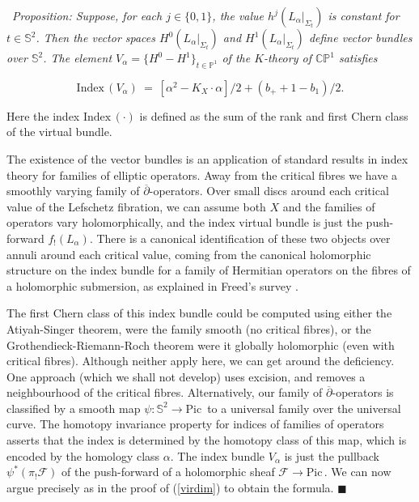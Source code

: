 \documentclass[10pt]{article}
\newcommand{\pp}{\mathbb{P}}
\newcommand{\cc}{\mathbb{C}}
\newcommand{\sss}{\mathbb{S}}
\newcommand{\cdbar}{\overline{\partial}}
\newcommand{\Pic}{\mathrm{Pic \,}}
\newcommand{\ind}{\mathrm{Index \,}}
\newcounter{Universal}[section]
\renewcommand{\theUniversal}{\thesection.\arabic{Universal}}
\newenvironment{Italic}{\refstepcounter{Universal} \par \vspace{0.5cm}
\noindent {\bf (\theUniversal)}\ \it}{\par \vspace{0.5cm}}
\newenvironment{Prop}{\begin{Italic}{\sc Proposition:} }{\end{Italic}}
\newenvironment{Pf}{\par \noindent{\sc Proof:} }{\quad $\blacksquare$ \par
\vspace{0.5cm}}
\begin{document}
\begin{Prop} \label{indextheorem} Suppose, for each $j \in \{ 0,1 \}$,
  the value  $h^j
  (L_{\alpha}|_{\Sigma_t})$ is constant for $t \in \sss^2$.  Then the
  vector spaces $H^0 (L_{\alpha}|_{\Sigma_t})$ and $H^1
(L_{\alpha}|_{\Sigma_t})$ define vector bundles over $\sss^2$. The 
element $V_{\alpha} = \{ H^0 - H^1 \}_{t \in \pp^1}$ of the $K$-theory
  of $\cc \pp^1$ satisfies

$$\ind(V_{\alpha}) \ = \ [\alpha^2 - K_X \cdot \alpha]/2 + (b_+ +
1-b_1)/2.$$

\noindent Here the index $\ind(\cdot)$ is defined as the sum of the
rank and first Chern class of the virtual bundle.
\end{Prop}

\begin{Pf}
The existence of the vector bundles is an application of
standard results in index theory for families of elliptic operators.
Away from the critical fibres we have a smoothly varying family of
$\cdbar$-operators.  Over small discs around each critical value of the
Lefschetz fibration, we can assume both $X$ and the families of
operators vary holomorphically, and the index virtual bundle is just the
push-forward $f_! (L_{\alpha})$.  There is a canonical identification
of these two objects over annuli around each critical value, coming
from the canonical holomorphic structure on the index bundle for a
family of Hermitian operators on the fibres of a holomorphic submersion,
as explained in Freed's survey \cite{Freed}.

\vspace{0.2cm}

\noindent The first Chern class of this index bundle could be computed
using either the Atiyah-Singer theorem, were the family smooth (no
critical fibres), or the
Grothendieck-Riemann-Roch theorem were it globally holomorphic (even with
critical fibres).  Although neither apply here, we can get around the
deficiency.  One approach (which we shall not develop) uses excision,
and removes a neighbourhood of the critical fibres.  Alternatively, our
family of $\cdbar$-operators is classified by a smooth map $\psi:
\sss^2 \rightarrow \Pic$ to a universal family over the universal
curve.  The homotopy invariance property for indices of families of
operators asserts that the index is determined by the homotopy class
of this map, which is encoded by the homology class $\alpha$.  The
index bundle $V_{\alpha}$ is just the pullback $\psi^*
(\pi_! \mathcal{F})$ of the push-forward of a holomorphic sheaf
$\mathcal{F} \rightarrow \Pic$.  We can now argue precisely as in the proof of
(\ref{virdim}) to obtain the formula.
\end{Pf}
\end{document}
